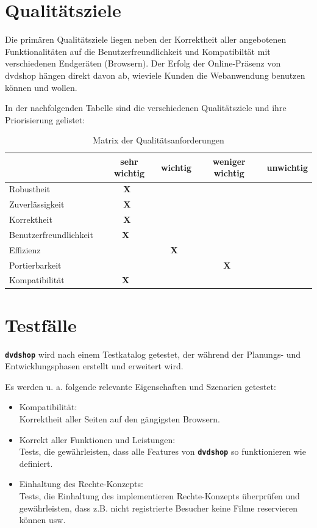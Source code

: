 \documentclass[12pt,oneside,a4paper,bibtotoc,liststotoc,pointlessnumbers]{scrartcl}
\begin{document}
\section{Qualitätsziele}
Die primären Qualitätsziele liegen neben der Korrektheit aller angebotenen Funktionalitäten auf die Benutzerfreundlichkeit und Kompatibiltät mit verschiedenen Endgeräten (Browsern). Der Erfolg der Online-Präsenz von dvdshop hängen direkt davon ab, wieviele Kunden die Webanwendung benutzen können und wollen.\par
In der nachfolgenden Tabelle sind die verschiedenen Qualitätsziele und ihre Priorisierung gelistet:
\begin{table}[h]							
\begin{center}
 \begin{tabular}{l|c|c|c|c}
  ~ & sehr wichtig & wichtig & weniger wichtig & unwichtig\\
  \hline \hline
  Robustheit~ & \textbf{X}~ &  ~ ~ ~ &  ~ ~ ~ &  ~ ~ ~ \\
  \hline
  Zuverlässigkeit~ & \textbf{X}~ &  ~ ~ ~ &  ~ ~ ~ &  ~ ~ ~ \\
  \hline
  Korrektheit~ & \textbf{X}~ &  ~ ~ ~ &  ~ ~ ~ &  ~ ~ ~ \\
  \hline
  Benutzerfreundlichkeit~ &  \textbf{X} ~ & ~ ~ ~ &  ~ ~ ~ &  ~ ~ ~ \\
  \hline
  Effizienz~ &  ~ ~ ~ & \textbf{X}~ &  ~ ~ ~ &  ~ ~ ~ \\
  \hline
  Portierbarkeit~ &  ~ ~ ~ &  ~ ~ ~ & \textbf{X}~ &  ~ ~ ~ \\
  \hline
  Kompatibilität~ &  \textbf{X} ~ &  ~ ~ ~ & ~ ~ ~ &  ~ ~ ~ \\
 \end{tabular}
\end{center}
\caption{Matrix der Qualitätsanforderungen}									%
\label{fig:Qualitaet}												%
\end{table}



\newpage
\section{Testfälle}
\texttt{\textbf{dvdshop}} wird nach einem Testkatalog getestet, der während der Planungs- und Entwicklungsphasen erstellt und erweitert wird.\par
Es werden u. a. folgende relevante Eigenschaften und Szenarien getestet:
\begin{itemize}
\item Kompatibilität: \\Korrektheit aller Seiten auf den gängigsten Browsern.
\item Korrekt aller Funktionen und Leistungen: \\Tests, die gewährleisten, dass alle Features von \texttt{\textbf{dvdshop}} so funktionieren wie definiert.
\item Einhaltung des Rechte-Konzepts: \\Tests, die Einhaltung des implementieren Rechte-Konzepts überprüfen und gewährleisten, dass z.B. nicht registrierte Besucher keine Filme reservieren können usw.
\end{itemize}
\end{document}
